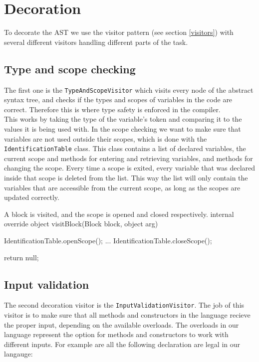 \section{Decoration}
To decorate the AST we use the visitor pattern (see section \ref{visitors}) with several different visitors handling different parts of the task. \newline

\subsection{Type and scope checking}
The first one is the \texttt{TypeAndScopeVisitor} which visits every node of the abstract syntax tree, and checks if the types and scopes of variables in the code are correct. Therefore this is where type safety is enforced in the compiler.\\
This works by taking the type of the variable's token and comparing it to the values it is being used with. \newline
In the scope checking we want to make sure that variables are not used outside their scopes, which is done with the \texttt{IdentificationTable} class. 
This class contains a list of declared variables, the current scope and methods for entering and retrieving variables, and methods for changing the scope.\newline
Every time a scope is exited, every variable that was declared inside that scope is deleted from the list.
This way the list will only contain the variables that are accessible from the current scope, as long as the scopes are updated correctly.

\begin{source}{A block is visited, and the scope is opened and closed respectively.}{}
internal override object visitBlock(Block block, object arg)
		{
        IdentificationTable.openScope();
        ...
        IdentificationTable.closeScope();

        return null;
     }
\end{source}

\subsection{Input validation}
\label{inputvalidation}
The second decoration visitor is the \texttt{InputValidationVisitor}. 
The job of this visitor is to make sure that all methods and constructors in the language recieve the proper input, depending on the available overloads. 
The overloads in our language represent the option for methods and constructors to work with different inputs.
For example are all the following declaration are legal in our langauge:

